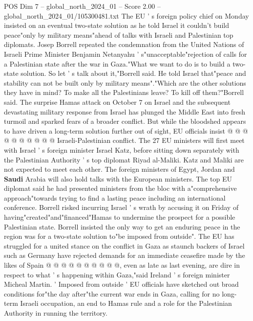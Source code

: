 \begin{textsample}{POS Dim 7 – global\_north\_2024\_01 – Score 2.00 – global\_north\_2024\_01/105300481.txt}  \label{ex:f7_pos_244}
The EU ' s foreign policy chief on Monday insisted on an eventual two-state solution as he told Israel it couldn't build peace"only by military means"ahead of talks with Israeli and Palestinian top diplomats.
Josep Borrell repeated the condemnation from the United Nations of Israeli Prime Minister Benjamin Netanyahu ' s"unacceptable"rejection of calls for a Palestinian state after the war in Gaza."What we want to do is to build a two-state solution.
So let ' s talk about it,"Borrell said.
He told Israel that"peace and stability can not be built only by military means"."Which are the other solutions they have in mind?
To make all the Palestinians leave?
To kill off them?"Borrell said.
The surprise Hamas attack on October 7 on Israel and the subsequent devastating military response from Israel has plunged the Middle East into fresh turmoil and sparked fears of a broader conflict.
But while the bloodshed appears to have driven a long-term solution further out of sight, EU officials insist @ @ @ @ @ @ @ @ @ @ Israeli-Palestinian conflict.
The 27 EU ministers will first meet with Israel ' s foreign minister Israel Katz, before sitting down separately with the Palestinian Authority ' s top diplomat Riyad al-Maliki.
Katz and Maliki are not expected to meet each other.
The foreign ministers of Egypt, Jordan and \textbf{Saudi} Arabia will also hold talks with the European ministers.
The top EU diplomat said he had presented ministers from the bloc with a"comprehensive approach"towards trying to find a lasting peace including an international conference.
Borrell risked incurring Israel ' s wrath by accusing it on Friday of having"created"and"financed"Hamas to undermine the prospect for a possible Palestinian state.
Borrell insisted the only way to get an enduring peace in the region was for a two-state solution to"be imposed from outside".
The EU has struggled for a united stance on the conflict in Gaza as staunch backers of Israel such as Germany have rejected demands for an immediate ceasefire made by the likes of Spain @ @ @ @ @ @ @ @ @ @, even as late as last evening, are dire in respect to what ' s happening within Gaza,"said Ireland ' s foreign minister Micheal Martin. ' Imposed from outside ' EU officials have sketched out broad conditions for"the day after"the current war ends in Gaza, calling for no long-term Israeli occupation, an end to Hamas rule and a role for the Palestinian Authority in running the territory.

\end{textsample}
